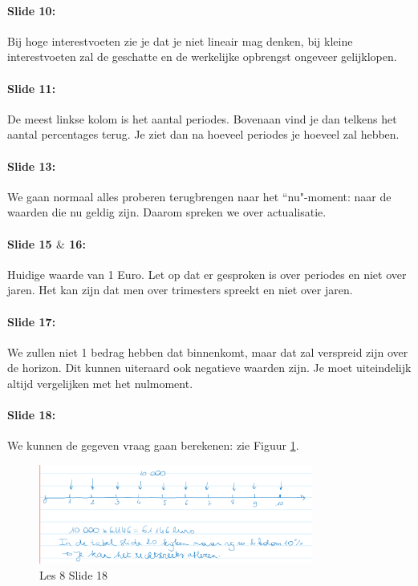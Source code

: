 \documentclass[10pt,a4paper]{report}
\begin{document}
\paragraph{Slide 10:} Bij hoge interestvoeten zie je dat je niet lineair mag denken, bij kleine interestvoeten zal de geschatte en de werkelijke opbrengst ongeveer gelijklopen.

\paragraph{Slide 11:} De meest linkse kolom is het aantal periodes. Bovenaan vind je dan telkens het aantal percentages terug. Je ziet dan na hoeveel periodes je hoeveel zal hebben.

\paragraph{Slide 13:} We gaan normaal alles proberen terugbrengen naar het ``nu"-moment: naar de waarden die nu geldig zijn. Daarom spreken we over actualisatie. 

\paragraph{Slide 15 $\&$ 16:} Huidige waarde van 1 Euro. Let op dat er gesproken is over periodes en niet over jaren. Het kan zijn dat men over trimesters spreekt en niet over jaren.

\paragraph{Slide 17:} We zullen niet 1 bedrag hebben dat binnenkomt, maar dat zal verspreid zijn over de horizon. Dit kunnen uiteraard ook negatieve waarden zijn. Je moet uiteindelijk altijd vergelijken met het nulmoment.

\paragraph{Slide 18:} We kunnen de gegeven vraag gaan berekenen: zie Figuur \ref{les08_04}.

\begin{figure}[h!]
\centering
\includegraphics[width=90mm]{Les08_04.png}
\caption{Les 8 Slide 18} 
\label{les08_04}
\end{figure}
\end{document}
